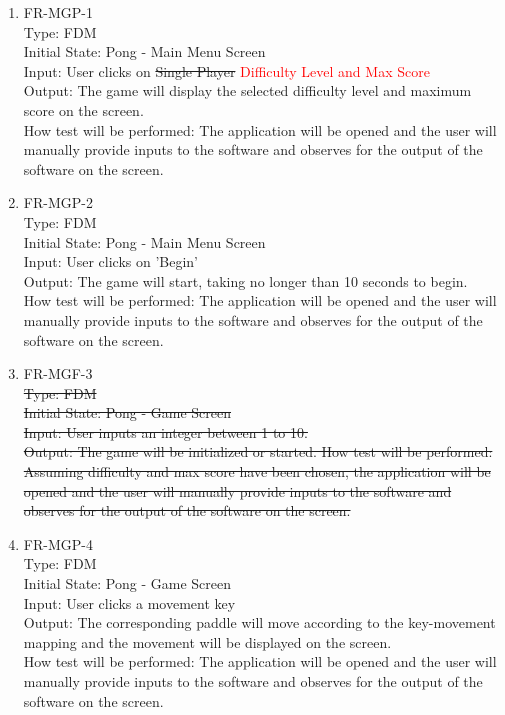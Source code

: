 \documentclass[12pt, titlepage]{article}
\begin{document}
\begin{enumerate}

\item{FR-MGP-1\\}
Type: FDM\\
Initial State: Pong - Main Menu Screen\\
Input: User clicks on \sout{Single Player} \textcolor{red}{Difficulty Level and Max Score}\\
Output: The game will display the selected difficulty level and maximum score on the screen.\\
How test will be performed: The application will be opened and the user will manually provide inputs to the software and observes for the output of the software on the screen.\\

\item{FR-MGP-2\\}
Type: FDM\\
Initial State: Pong - Main Menu Screen\\
Input: User clicks on 'Begin'\\
Output: The game will start, taking no longer than 10 seconds to begin.\\
How test will be performed: The application will be opened and the user will manually provide inputs to the software and observes for the output of the software on the screen.\\

\item{FR-MGF-3\\}
\sout{Type: FDM\\
Initial State: Pong - Game Screen\\
Input: User inputs an integer between 1 to 10.\\
Output: The game will be initialized or started.
How test will be performed: Assuming difficulty and max score have been chosen, the application will be opened and the user will manually provide inputs to the software and observes for the output of the software on the screen.\\}

\item{FR-MGP-4\\}
Type: FDM\\
Initial State: Pong - Game Screen\\
Input: User clicks a movement key\\
Output: The corresponding paddle will move according to the key-movement mapping and the movement will be displayed on the screen.\\
How test will be performed: The application will be opened and the user will manually provide inputs to the software and observes for the output of the software on the screen.\\


\end{enumerate}
\end{document}
